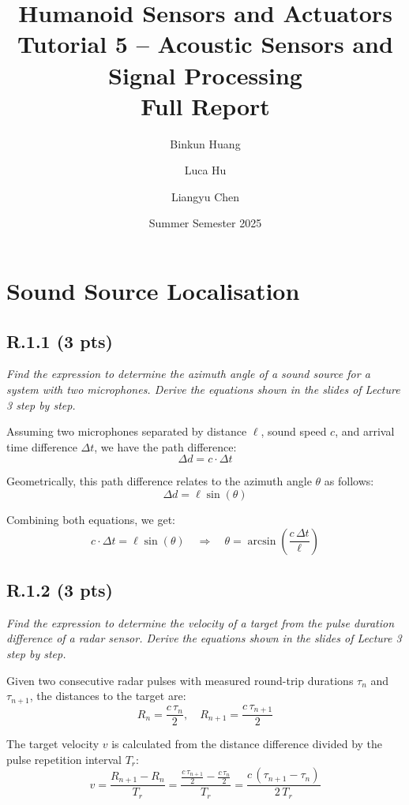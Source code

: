 \documentclass{article}
\title{\textbf{Humanoid Sensors and Actuators}\\
        Tutorial 5 – Acoustic Sensors and Signal Processing\\[4pt]
        Full Report}
\author{Binkun Huang \and Luca Hu \and Liangyu Chen}
\date{Summer Semester 2025}
\begin{document}
\maketitle



\section{Sound Source Localisation}

\subsection*{R.1.1 (3 pts)}
\emph{Find the expression to determine the azimuth angle of a sound source for a system with two microphones. Derive the equations shown in the slides of Lecture 3 step by step.}

Assuming two microphones separated by distance $\ell$, sound speed $c$, and arrival time difference $\Delta t$, we have the path difference:
\[
\Delta d = c \cdot \Delta t
\]

Geometrically, this path difference relates to the azimuth angle $\theta$ as follows:
\[
\Delta d = \ell \sin(\theta)
\]

Combining both equations, we get:
\[
c \cdot \Delta t = \ell \sin(\theta) \quad \Rightarrow \quad \theta = \arcsin\left(\frac{c\,\Delta t}{\ell}\right)
\]


\subsection*{R.1.2 (3 pts)}
\emph{Find the expression to determine the velocity of a target from the pulse duration difference of a radar sensor. Derive the equations shown in the slides of Lecture 3 step by step.}

Given two consecutive radar pulses with measured round-trip durations $\tau_n$ and $\tau_{n+1}$, the distances to the target are:
\[
R_n = \frac{c\,\tau_n}{2}, \quad R_{n+1} = \frac{c\,\tau_{n+1}}{2}
\]

The target velocity $v$ is calculated from the distance difference divided by the pulse repetition interval $T_r$:
\[
v = \frac{R_{n+1}-R_n}{T_r} = \frac{\frac{c\,\tau_{n+1}}{2}-\frac{c\,\tau_n}{2}}{T_r} = \frac{c\,(\tau_{n+1}-\tau_n)}{2\,T_r}
\]
\end{document}
